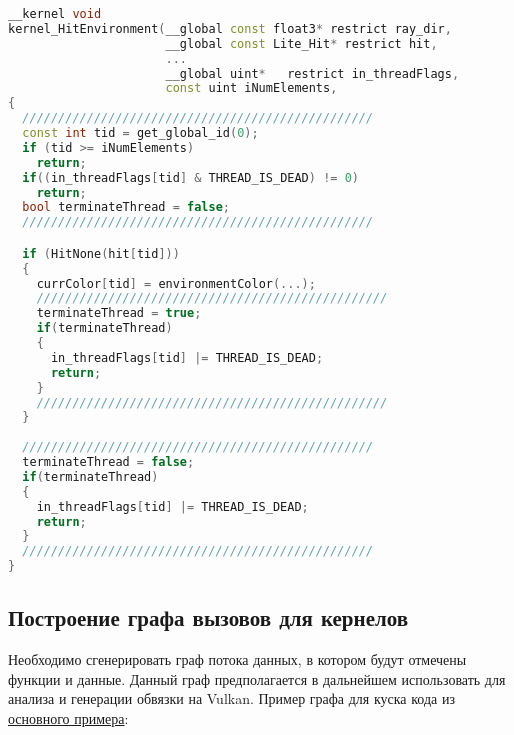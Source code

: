 \documentclass[a4paper,12pt]{article}
\begin{document}
\begin{lstlisting}[language=C++, caption=Пример выхода для bool функции, captionpos=b, label=outputexample]
__kernel void 
kernel_HitEnvironment(__global const float3* restrict ray_dir,
                      __global const Lite_Hit* restrict hit,
                      ...
                      __global uint*   restrict in_threadFlags,
                      const uint iNumElements,
{
  /////////////////////////////////////////////////
  const int tid = get_global_id(0);
  if (tid >= iNumElements)
    return;
  if((in_threadFlags[tid] & THREAD_IS_DEAD) != 0)
    return;
  bool terminateThread = false;
  /////////////////////////////////////////////////

  if (HitNone(hit[tid]))
  {
    currColor[tid] = environmentColor(...);
    /////////////////////////////////////////////////
    terminateThread = true;
    if(terminateThread)
    {
      in_threadFlags[tid] |= THREAD_IS_DEAD;
      return;
    }
    /////////////////////////////////////////////////
  }
  
  /////////////////////////////////////////////////
  terminateThread = false;
  if(terminateThread)
  {
    in_threadFlags[tid] |= THREAD_IS_DEAD;
    return;
  }
  /////////////////////////////////////////////////
}
\end{lstlisting}

\subsection{Построение графа вызовов для кернелов}

Необходимо сгенерировать граф потока данных, в котором будут отмечены функции и данные. Данный граф предполагается в дальнейшем использовать для анализа и генерации обвязки на Vulkan. Пример графа для куска кода из \href{https://github.com/Ray-Tracing-Systems/HydraCore/blob/dev/hydra_drv/CPUExp_Integrators_PT_Loop.cpp}{основного примера}:

\end{document}
